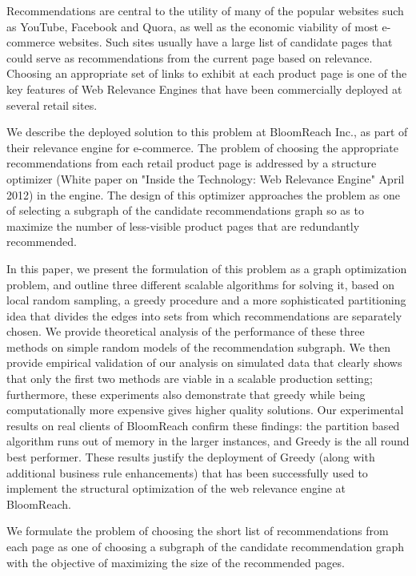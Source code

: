 \abstract

Recommendations are central to the utility of many of the popular websites such as YouTube, Facebook and Quora, as well as the economic viability of most e-commerce websites. Such sites usually have a large list of candidate pages that could serve as recommendations from the current page based on relevance. Choosing an appropriate set of links to exhibit at each product page is one of the key features of Web Relevance Engines that have been commercially deployed at several retail sites.

We describe the deployed solution to this problem at BloomReach Inc., as part of their relevance engine for e-commerce. The problem of choosing the appropriate recommendations from each retail product page is addressed by a structure optimizer (White paper on "Inside the Technology: Web Relevance Engine" April 2012) in the engine. The design of this optimizer approaches the problem as one of selecting a subgraph of the candidate recommendations graph so as to maximize the number of less-visible product pages that are redundantly recommended. 

In this paper, we present the formulation of this problem as a graph optimization problem, and outline three different scalable algorithms for solving it, based on local random sampling, a greedy procedure and a more sophisticated partitioning idea that divides the edges into sets from which recommendations are separately chosen. We provide theoretical analysis of the performance of these three methods on simple random models of the recommendation subgraph. We then provide empirical validation of our analysis on simulated data that clearly shows that only the first two methods are viable in a scalable production setting; furthermore, these experiments also demonstrate that greedy while being computationally more expensive gives higher quality solutions. Our experimental results on real clients of BloomReach confirm these findings: the partition based algorithm runs out of memory in the larger instances, and Greedy is the all round best performer. These results justify the deployment of Greedy (along with additional business rule enhancements) that has been successfully used to implement the structural optimization of the web relevance engine at BloomReach.

\iffalse 

We formulate the problem of choosing the short list of recommendations from each page as one of choosing a subgraph of the candidate recommendation graph with the objective of maximizing the size of the recommended pages.

